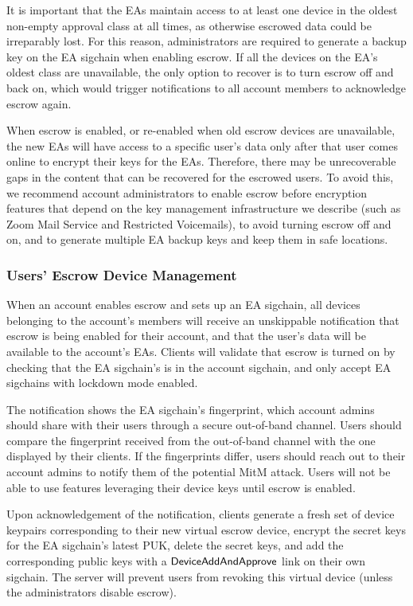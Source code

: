 It is important that the EAs maintain access to at least one device in the oldest non-empty approval
class at all times, as otherwise escrowed data could be irreparably lost. For this reason,
administrators are required to generate a backup key on the EA sigchain when enabling escrow. If all
the devices on the EA's oldest class are unavailable, the only option to recover is to turn escrow
off and back on, which would trigger notifications to all account members to acknowledge escrow
again.

When escrow is enabled, or re-enabled when old escrow devices are unavailable, the new EAs will have
access to a specific user's data only after that user comes online to encrypt their keys for the
EAs. Therefore, there may be unrecoverable gaps in the content that can be recovered for the
escrowed users. To avoid this, we recommend account administrators to enable escrow before
encryption features that depend on the key management infrastructure we describe (such as Zoom Mail
Service and Restricted Voicemails), to avoid turning escrow off and on, and to generate
multiple EA backup keys and keep them in safe locations.

\subsubsection{Users' Escrow Device Management}
\label{subsubsec:escrowmgmt}

When an account enables escrow and sets up an EA sigchain, all devices belonging to the account's
members will receive an unskippable notification that escrow is being enabled for their account, and
that the user's data will be available to the account's EAs. Clients will validate that escrow is
turned on by checking that the EA sigchain's \userID{} is in the account sigchain, and only accept
EA sigchains with lockdown mode enabled.

The notification shows the EA sigchain's fingerprint, which account admins should share with their
users through a secure out-of-band channel. Users should compare the fingerprint received from the
out-of-band channel with the one displayed by their clients. If the fingerprints differ, users
should reach out to their account admins to notify them of the potential MitM attack. Users will not
be able to use features leveraging their device keys until escrow is enabled.

Upon acknowledgement of the notification, clients generate a fresh set of device keypairs
corresponding to their new virtual escrow device, encrypt the secret keys for the EA sigchain's
latest PUK, delete the secret keys, and add the corresponding public keys with a
$\mathsf{DeviceAddAndApprove}{}$ link on their own sigchain. The server will prevent users from revoking
this virtual device (unless the administrators disable escrow).

